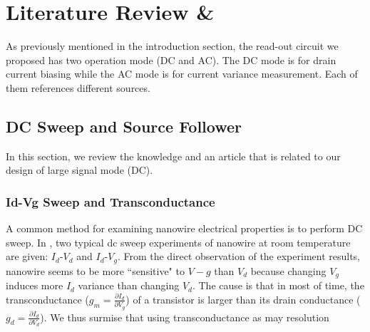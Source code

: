 \chapter{Literature Review \&}
As previously mentioned in the introduction section, the read-out circuit we proposed has two operation mode (DC and AC).
The DC mode is for drain current biasing while the AC mode is for current variance measurement.
Each of them references different sources.

\section{DC Sweep and Source Follower}
In this section, we review the knowledge and an article that is related to our design of large signal mode (DC).

\subsection{Id-Vg Sweep and Transconductance}
A common method for examining nanowire electrical properties is to perform DC sweep.
In \cite{DN17}, two typical dc sweep experiments of nanowire at room temperature are given: $I_d$-$V_d$ and $I_d$-$V_g$.
From the direct observation of the experiment results, nanowire seems to be more ``sensitive" to $V-g$ than $V_d$ because changing $V_g$ induces more $I_d$ variance than changing $V_d$.
The cause is that in most of time, the transconductance ($g_m = \frac{\partial I_d}{\partial V_g}$) of a transistor is larger than its drain conductance ($g_d =  \frac{\partial I_d}{\partial V_d}$).
{\color{red}We thus surmise that using transconductance as may resolution }









